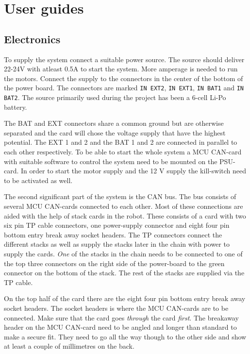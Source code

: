 \section{User guides}

\subsection{Electronics}
To supply the system connect a suitable power source. The source should deliver 22-24V with atleast 0.5A to start the system. More amperage is needed to run the motors. Connect the supply to the connectors in the center of the bottom of the power board. The connectors are marked \texttt{IN EXT2}, \texttt{IN EXT1}, \texttt{IN BAT1} and \texttt{IN BAT2}. The source primarily used during the project has been a 6-cell Li-Po battery.

The BAT and EXT connectors share a common ground but are otherwise separated and the card will chose the voltage supply that have the highest potential. The EXT 1 and 2 and the BAT 1 and 2 are connected in parallel to each other respectively. To be able to start the whole system a MCU CAN-card with suitable software to control the system need to be mounted on the PSU-card. In order to start the motor supply and the 12 V supply the kill-switch need to be activated as well. 

The second significant part of the system is the CAN bus. The bus consists of several MCU CAN-cards connected to each other. Most of these connections are aided with the help of stack cards in the robot. These consists of a card with two six pin TP cable connectors, one power-supply connector and eight four pin bottom entry break away socket headers. The TP connectors connect the different stacks as well as supply the stacks later in the chain with power to supply the cards. \emph{One} of the stacks in the chain needs to be connected to one of the top three connectors on the right side of the power-board to the green connector on the bottom of the stack. The rest of the stacks are supplied via the TP cable. 

On the top half of the card there are the eight four pin bottom entry break away socket headers. The socket headers is where the MCU CAN-cards are to be connected. Make sure that the card goes \emph{through} the card \emph{first}. The breakaway header on the MCU CAN-card need to be angled and longer than standard to make a secure fit. They need to go all the way though to the other side and show at least a couple of millimetres on the back. 


